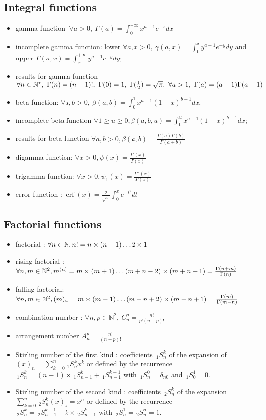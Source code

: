 \subsection{Integral functions}
\begin{itemize}
\item gamma function: $ \forall a > 0, ~\Gamma(a) = \int_0^{+\infty} x^{a-1} e^{-x} dx$
\item incomplete gamma function: lower $\forall a,x > 0, ~\gamma(a,x) = \int_0^{x} y^{a-1} e^{-y} dy$ and upper $\Gamma(a,x) = \int_x^{+\infty} y^{a-1} e^{-y} dy $;
\item results for gamma function $\forall n \in \mathbb{N}^{\star}, ~\Gamma(n) = (n-1)!, ~\Gamma(0)=1,~\Gamma(\frac{1}{2}) = \sqrt{\pi},~ \forall a > 1, ~\Gamma(a) = (a-1)\Gamma(a-1)$
\item beta function: $\forall a,b > 0, ~\beta(a,b) = \int_0^{1} x^{a-1} (1-x)^{b-1} dx$, 
\item incomplete beta function $\forall 1\geq u\geq 0, \beta(a,b,u)=\int_0^{u} x^{a-1} (1-x)^{b-1} dx $;
\item results for beta function $\forall a,b>0, \beta(a,b) = \frac{\Gamma(a)\Gamma(b)}{\Gamma(a+b)}$
\item digamma function: $\forall x>0, \psi(x) = \frac{\Gamma'(x)}{\Gamma(x)}$
\item trigamma function: $\forall x>0, \psi_1(x) = \frac{\Gamma''(x)}{\Gamma(x)}$
\item error function : $\operatorname{erf}(x) = \frac{2}{\sqrt{\pi}}\int_0^x e^{-t^2} dt$
\end{itemize}



\subsection{Factorial functions}
\begin{itemize}
\item factorial : $\forall n \in \mathbb{N}, n! = n\times(n-1)\dots 2\times 1$
\item rising factorial : $\forall n,m \in \mathbb{N}^2, m^{(n)} = m\times(m+1)\dots (m+n-2)\times (m+n-1)=\frac{\Gamma(n+m)}{\Gamma(n)}$
\item falling factorial: $\forall n,m \in \mathbb{N}^2, (m)_{n} = m\times(m-1)\dots (m-n+2)\times (m-n+1)=\frac{\Gamma(m)}{\Gamma(m-n)}$ 
\item combination number : $\forall n,p \in \mathbb{N}^2, ~C_n^p = \frac{n!}{p!(n-p)!}$
\item arrangement number $A_n^p = \frac{n!}{(n-p)!}$
\item Stirling number of the first kind : coefficients $\,_1S_n^k$ of the expansion of $(x)_n = \sum_{k=0}^n \,_1S_n^k x^k$ or defined by the recurrence $\,_1S_{n}^k = (n-1)\times \,_1S_{n-1}^k + \,_1S_{n-1}^{k-1}$ with $\,_1S_n^0 = \delta_{n0}$ and $\,_1S_0^1 =  0$.
\item Stirling number of the second kind : coefficients $\,_2S_n^k$ of the expansion $\sum_{k=0}^n \,_2S_n^k (x)_k=x^n$ or defined by the recurrence $\,_2S_n^k=\,_2S_{n-1}^{k-1} +k\times \,_2S_{n-1}^k$ with $\,_2S_n^1=\,_2S_n^n=1$.
\end{itemize}

